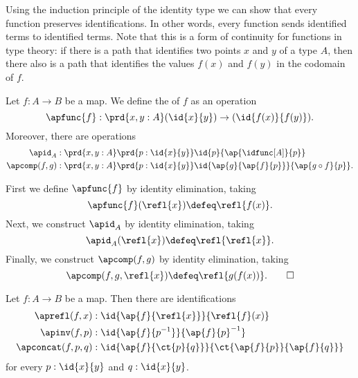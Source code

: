 Using the induction principle of the identity type we can show that every function preserves identifications.
In other words, every function sends identified terms to identified terms.
Note that this is a form of continuity for functions in type theory: if there is a path that identifies two points $x$ and $y$ of a type $A$, then there also is a path that identifies the values $f(x)$ and $f(y)$ in the codomain of $f$. 

\begin{defn}\label{defn:ap}
Let $f:A\to B$ be a map. We define the  of $f$ as an operation
\begin{equation*}
\apfunc{f} : \prd{x,y:A} (\id{x}{y})\to(\id{f(x)}{f(y)}).
\end{equation*}
Moreover, there are operations
\begin{align*}
\apid_A & : \prd{x,y:A}\prd{p:\id{x}{y}} \id{p}{\ap{\idfunc[A]}{p}} \\
\apcomp(f,g) & : \prd{x,y:A}\prd{p:\id{x}{y}} \id{\ap{g}{\ap{f}{p}}}{\ap{g\circ f}{p}}.
\end{align*}
\end{defn}

\begin{constr}
First we define $\apfunc{f}$ by identity elimination, taking
\begin{equation*}
\apfunc{f}(\refl{x})\defeq \refl{f(x)}.
\end{equation*}
Next, we construct $\apid_A$ by identity elimination, taking
\begin{equation*}
\apid_A(\refl{x}) \defeq \refl{\refl{x}}.
\end{equation*}
Finally, we construct $\apcomp(f,g)$ by identity elimination, taking
\begin{equation*}
\apcomp(f,g,\refl{x}) \defeq \refl{g(f(x))}.\qedhere
\end{equation*}
\end{constr}

\begin{defn}\label{defn:ap-preserve}
Let $f:A\to B$ be a map. Then there are identifications
\begin{align*}
\aprefl(f,x) & : \id{\ap{f}{\refl{x}}}{\refl{f}(x)} \\
\apinv(f,p) & : \id{\ap{f}{p^{-1}}}{\ap{f}{p}^{-1}} \\
\apconcat(f,p,q) & : \id{\ap{f}{\ct{p}{q}}}{\ct{\ap{f}{p}}{\ap{f}{q}}}
\end{align*}
for every $p:\id{x}{y}$ and $q:\id{x}{y}$.
\end{defn}

